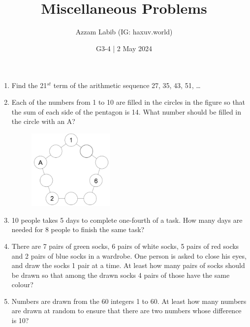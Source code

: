 \documentclass[11pt]{scrartcl}
\title{Miscellaneous Problems}
\author{Azzam Labib (IG: haxuv.world)}
\date{G3-4 | 2 May 2024}
\begin{document}
\maketitle

\begin{enumerate}
    \section{Logical Thinking and Combinatorics}
    \item Find the 21$^{st}$ term of the arithmetic sequence 27, 35, 43, 51, \ldots


    \vspace{5cm}\item Each of the numbers from 1 to 10 are filled in the circles in the figure so that the sum of each side of the pentagon is 14. What number should be filled in the circle with an A?
    \begin{figure}[h]
        \centering
        \includegraphics[width=0.4\textwidth]{StarGen/AIMO Trial G3-4 2024/necklace5.png}
    \end{figure}

    \vspace{10cm}\item 10 people takes 5 days to complete one-fourth of a task. How many days are needed for 8 people to finish the same task?

    \vspace{10cm}\item There are 7 pairs of green socks, 6 pairs of white socks, 5 pairs of red socks and 2 pairs of blue socks in a wardrobe. One person is asked to close his eyes, and draw the socks 1 pair at a time. At least how many pairs of socks should be drawn so that among the drawn socks 4 pairs of those have the same colour?
    
    \vspace{10cm}\item Numbers are drawn from the 60 integers 1 to 60. At least how many numbers are drawn at random to ensure that there are two numbers whose difference is 10?


\end{enumerate}
\end{document}
